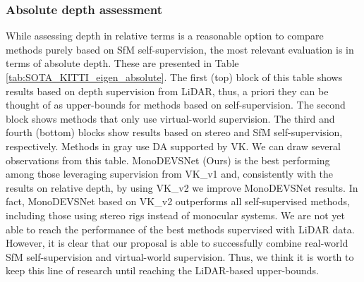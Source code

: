 \documentclass[journal]{IEEEtran}
\newcommand{\Tab}[1]{Table \ref{tab:#1}}
\begin{document}
\subsubsection{Absolute depth assessment}
While assessing depth in relative terms is a reasonable option to compare methods purely based on SfM self-supervision, the most relevant evaluation is in terms of absolute depth. These are presented in \Tab{SOTA_KITTI_eigen_absolute}. The first (top) block of this table shows results based on depth supervision from LiDAR, thus, a priori they can be thought of as upper-bounds for methods based on self-supervision. The second block shows methods that only use virtual-world supervision. The third and fourth (bottom) blocks show results based on stereo and SfM self-supervision, respectively. Methods in gray use DA supported by VK. We can draw several observations from this table. MonoDEVSNet (Ours) is the best performing among those leveraging supervision from VK\_v1 and, consistently with the results on relative depth, by using VK\_v2 we improve MonoDEVSNet results. In fact, MonoDEVSNet based on VK\_v2 outperforms all self-supervised methods, including those using stereo rigs instead of monocular systems. We are not yet able to reach the performance of the best methods supervised with LiDAR data. However, it is clear that our proposal is able to successfully combine real-world SfM self-supervision and virtual-world supervision. Thus, we think it is worth to keep this line of research until reaching the LiDAR-based upper-bounds.
\end{document}
